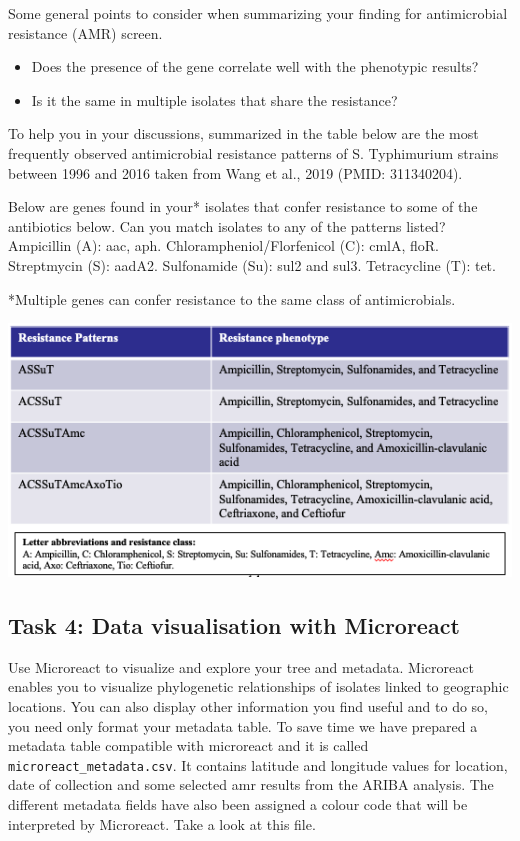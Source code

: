 \documentclass[11pt]{article}
\providecommand{\tightlist}{%
      \setlength{\itemsep}{0pt}\setlength{\parskip}{0pt}}
\begin{document}
Some general points to consider when summarizing your finding for
antimicrobial resistance (AMR) screen.

\begin{itemize}
\tightlist
\item
  Does the presence of the gene correlate well with the phenotypic
  results?
\item
  Is it the same in multiple isolates that share the resistance?
\end{itemize}

To help you in your discussions, summarized in the table below are the
most frequently observed antimicrobial resistance patterns of S.
Typhimurium strains between 1996 and 2016 taken from Wang et al., 2019
(PMID: 311340204).

Below are genes found in your* isolates that confer resistance to some
of the antibiotics below. Can you match isolates to any of the patterns
listed? Ampicillin (A): aac, aph. Chlorampheniol/Florfenicol (C): cmlA,
floR. Streptmycin (S): aadA2. Sulfonamide (Su): sul2 and sul3.
Tetracycline (T): tet.

*Multiple genes can confer resistance to the same class of
antimicrobials.


\begin{center}
\includegraphics[AMR Resistance Patterns]{img/gene_table.png}
\end{center}


    \hypertarget{task-4-data-visualisation-with-microreact}{%
\subsection{Task 4: Data visualisation with
Microreact}\label{task-4-data-visualisation-with-microreact}}

Use Microreact to visualize and explore your tree and metadata.
Microreact enables you to visualize phylogenetic relationships of
isolates linked to geographic locations. You can also display other
information you find useful and to do so, you need only format your
metadata table. To save time we have prepared a metadata table
compatible with microreact and it is called
\texttt{microreact\_metadata.csv}. It contains latitude and longitude
values for location, date of collection and some selected amr results
from the ARIBA analysis. The different metadata fields have also been
assigned a colour code that will be interpreted by Microreact. Take a
look at this file.
\end{document}
